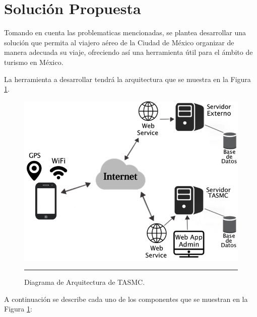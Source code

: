 \section{Solución Propuesta}

Tomando en cuenta las problematicas mencionadas, se plantea desarrollar una solución que permita al viajero aéreo de la Ciudad de México organizar de manera adecuada su viaje, ofreciendo así una herramienta útil para el ámbito de turismo en México.

La herramienta a desarrollar tendrá la arquitectura que se muestra en la Figura \ref{fig:Arquitectura}. 

\begin{figure}[htbp]
	\centering
		\includegraphics{Figuras/arquitectura.png}
		\rule{35em}{0.5pt}
	\caption[Diagrama de Arquitectura de TASMC]{Diagrama de Arquitectura de TASMC.}
	\label{fig:Arquitectura}
\end{figure}

A continuación se describe cada uno de los componentes que se muestran en la Figura \ref{fig:Arquitectura}:

